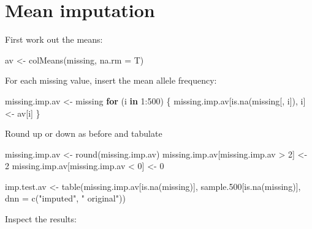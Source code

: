 \documentclass[
]{book}
\newenvironment{Shaded}{\begin{snugshade}}{\end{snugshade}}
\newcommand{\AttributeTok}[1]{\textcolor[rgb]{0.77,0.63,0.00}{#1}}
\newcommand{\ControlFlowTok}[1]{\textcolor[rgb]{0.13,0.29,0.53}{\textbf{#1}}}
\newcommand{\DecValTok}[1]{\textcolor[rgb]{0.00,0.00,0.81}{#1}}
\newcommand{\FloatTok}[1]{\textcolor[rgb]{0.00,0.00,0.81}{#1}}
\newcommand{\FunctionTok}[1]{\textcolor[rgb]{0.00,0.00,0.00}{#1}}
\newcommand{\NormalTok}[1]{#1}
\newcommand{\OtherTok}[1]{\textcolor[rgb]{0.56,0.35,0.01}{#1}}
\newcommand{\SpecialCharTok}[1]{\textcolor[rgb]{0.00,0.00,0.00}{#1}}
\newcommand{\StringTok}[1]{\textcolor[rgb]{0.31,0.60,0.02}{#1}}
\begin{document}
\hypertarget{mean-imputation}{%
\section{Mean imputation}\label{mean-imputation}}

First work out the means:

\begin{Shaded}
\begin{Highlighting}[]
\NormalTok{av }\OtherTok{\textless{}{-}} \FunctionTok{colMeans}\NormalTok{(missing, }\AttributeTok{na.rm =}\NormalTok{ T)}
\end{Highlighting}
\end{Shaded}

For each missing value, insert the mean allele frequency:

\begin{Shaded}
\begin{Highlighting}[]
\NormalTok{missing.imp.av }\OtherTok{\textless{}{-}}\NormalTok{ missing}
\ControlFlowTok{for}\NormalTok{ (i }\ControlFlowTok{in} \DecValTok{1}\SpecialCharTok{:}\DecValTok{500}\NormalTok{) \{}
\NormalTok{    missing.imp.av[}\FunctionTok{is.na}\NormalTok{(missing[, i]), i] }\OtherTok{\textless{}{-}}\NormalTok{ av[i]}
\NormalTok{\}}
\end{Highlighting}
\end{Shaded}

Round up or down as before and tabulate

\begin{Shaded}
\begin{Highlighting}[]
\NormalTok{missing.imp.av }\OtherTok{\textless{}{-}} \FunctionTok{round}\NormalTok{(missing.imp.av)}
\NormalTok{missing.imp.av[missing.imp.av }\SpecialCharTok{\textgreater{}} \DecValTok{2}\NormalTok{] }\OtherTok{\textless{}{-}} \DecValTok{2}
\NormalTok{missing.imp.av[missing.imp.av }\SpecialCharTok{\textless{}} \DecValTok{0}\NormalTok{] }\OtherTok{\textless{}{-}} \DecValTok{0}

\NormalTok{imp.test.av }\OtherTok{\textless{}{-}} \FunctionTok{table}\NormalTok{(missing.imp.av[}\FunctionTok{is.na}\NormalTok{(missing)], sample}\FloatTok{.500}\NormalTok{[}\FunctionTok{is.na}\NormalTok{(missing)], }
    \AttributeTok{dnn =} \FunctionTok{c}\NormalTok{(}\StringTok{"imputed"}\NormalTok{, }\StringTok{"       original"}\NormalTok{))}
\end{Highlighting}
\end{Shaded}

Inspect the results:
\end{document}
